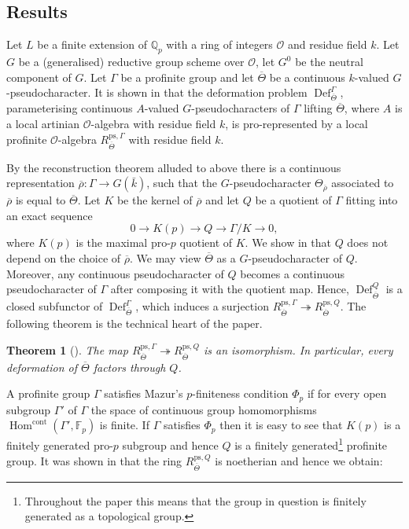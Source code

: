 \documentclass{amsart}
\newtheorem{thm}[prop]{Theorem}
\theoremstyle{definition}
\theoremstyle{remark}
\DeclareMathOperator{\Hom}{Hom}
\DeclareMathOperator{\Def}{Def}
\newcommand{\Qp}{\mathbb {Q}_p}
\newcommand{\Fp}{\mathbb F_p}
\newcommand{\OO}{\mathcal O}
\newcommand{\cont}{\mathrm{cont}}
\newcommand{\rhobar}{\overline{\rho}}
\newcommand{\kbar}{\bar{k}}
\newcommand{\Thetabar}{\overline{\Theta}}
\newcommand{\ps}{\mathrm{ps}}
\begin{document}
\subsection{Results} Let $L$ be a finite extension of $\Qp$ with a ring of integers $\OO$ and 
residue field $k$. Let $G$ be a (generalised) reductive group scheme over $\OO$, 
let $G^0$ be the neutral component of $G$. Let $\Gamma$ be a profinite group and 
let $\Thetabar$ be a continuous $k$-valued $G$-pseudocharacter. It is shown 
in \cite{quast} that the deformation problem $\Def^{\Gamma}_{\Thetabar}$, parameterising continuous $A$-valued
$G$-pseudocharacters  of $\Gamma$ lifting $\Thetabar$, where $A$ is a local  artinian $\OO$-algebra 
with residue field $k$, is  pro-represented by 
a local profinite $\OO$-algebra $R^{\ps,\Gamma}_{\Thetabar}$ with residue field $k$. 


By the reconstruction 
theorem alluded to above there is a continuous representation 
$\rhobar: \Gamma \rightarrow G(\kbar)$, such that the $G$-pseu\-do\-cha\-racter $\Theta_{\rhobar}$ associated 
to $\rhobar$ is equal to $\Thetabar$. Let $K$ be the kernel of $\rhobar$ and 
let $Q$ be a quotient of $\Gamma$ fitting into an exact sequence 
\begin{equation}\label{def_Q_intro}
0 \rightarrow K(p) \rightarrow Q \rightarrow \Gamma/K \rightarrow 0,
\end{equation}
where $K(p)$ is the maximal pro-$p$ quotient of $K$. We show in  that 
$Q$ does not depend on the choice of $\rhobar$. We may view $\Thetabar$ as a $G$-pseu\-do\-cha\-racter of $Q$. Moreover, any 
continuous pseudocharacter of $Q$ becomes  a continuous pseudocharacter
of $\Gamma$ after composing it with the quotient map. Hence, 
$\Def^Q_{\Thetabar}$ is a closed subfunctor of
$\Def^{\Gamma}_{\Thetabar}$,
which induces a surjection $R^{\ps, \Gamma}_{\Thetabar}\twoheadrightarrow R^{\ps, Q}_{\Thetabar}$. The following theorem
is the technical heart of the paper. 

\begin{thm}[{}]\label{intro_main} The map
$R^{\ps, \Gamma}_{\Thetabar}\twoheadrightarrow R^{\ps, Q}_{\Thetabar}$
is an isomorphism. In particular, every deformation of $\Thetabar$ factors through $Q$. 
\end{thm} 

A profinite group $\Gamma$ satisfies Mazur's $p$-finiteness condition $\Phi_p$ if for 
every open subgroup $\Gamma'$ of $\Gamma$ the space of continuous 
group homomorphisms $\Hom^{\cont}(\Gamma', \Fp)$ is finite. If $\Gamma$ satisfies $\Phi_p$ then 
it is easy to see that $K(p)$ is a finitely generated pro-$p$ subgroup 
and hence $Q$ is a finitely generated\footnote{Throughout the paper this means that the group in question is finitely generated as a topological group.} profinite group. It was shown 
in \cite{quast} that the ring $R^{\ps, Q}_{\Thetabar}$ is noetherian
and hence we obtain:
\end{document}
